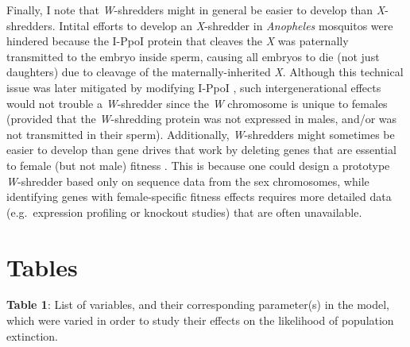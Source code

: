 \documentclass[]{rsos}%
\begin{document}
Finally, I note that \emph{W}-shredders might in general be easier to
develop than \emph{X}-shredders. Intital efforts to develop an
\emph{X}-shredder in \emph{Anopheles} mosquitos were hindered because
the I-PpoI protein that cleaves the \emph{X} was paternally transmitted
to the embryo inside sperm, causing all embryos to die (not just
daughters) due to cleavage of the maternally-inherited \emph{X}.
Although this technical issue was later mitigated by modifying I-PpoI
\citep{galizi2014sy}, such intergenerational effects would not trouble a
\emph{W}-shredder since the \emph{W} chromosome is unique to females
(provided that the \emph{W}-shredding protein was not expressed in
males, and/or was not transmitted in their sperm). Additionally,
\emph{W}-shredders might sometimes be easier to develop than gene drives
that work by deleting genes that are essential to female (but not male)
fitness \citep[e.g.][]{burt2018se}. This is because one could design a
prototype \emph{W}-shredder based only on sequence data from the sex
chromosomes, while identifying genes with female-specific fitness
effects requires more detailed data (e.g.~expression profiling or
knockout studies) that are often unavailable.

\newpage

\hypertarget{tables}{%
\section{Tables}\label{tables}}

\textbf{Table 1}: List of variables, and their corresponding
parameter(s) in the model, which were varied in order to study their
effects on the likelihood of population extinction.
\end{document}
